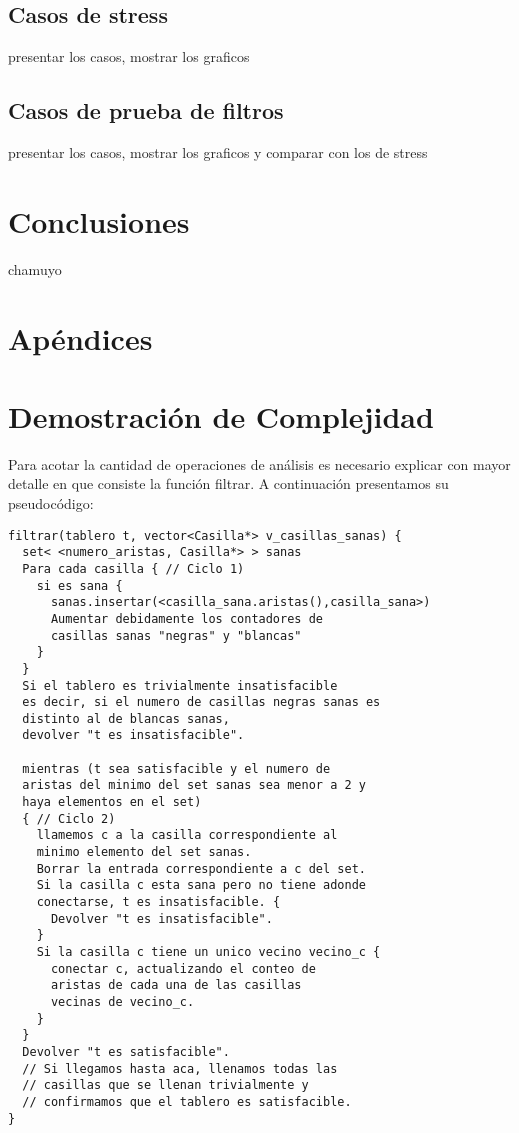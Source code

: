 \documentclass[a4paper, 12pt] {article}
\begin{document}
\subsection*{Casos de stress}
presentar los casos, mostrar los graficos

\subsection*{Casos de prueba de filtros}
presentar los casos, mostrar los graficos y comparar con los de stress




\section*{Conclusiones}
chamuyo


\section*{Ap\'endices} 
\section{Demostraci\'on de Complejidad}\label{demo:comp_3}

Para acotar la cantidad de operaciones de an\'alisis es necesario explicar con mayor detalle en que consiste la funci\'on filtrar.
A continuaci\'on presentamos su pseudoc\'odigo:

\begin{verbatim}
filtrar(tablero t, vector<Casilla*> v_casillas_sanas) {
  set< <numero_aristas, Casilla*> > sanas
  Para cada casilla { // Ciclo 1)
    si es sana {
      sanas.insertar(<casilla_sana.aristas(),casilla_sana>)
      Aumentar debidamente los contadores de 
      casillas sanas "negras" y "blancas"
    }
  }
  Si el tablero es trivialmente insatisfacible 
  es decir, si el numero de casillas negras sanas es 
  distinto al de blancas sanas,
  devolver "t es insatisfacible".
  
  mientras (t sea satisfacible y el numero de 
  aristas del minimo del set sanas sea menor a 2 y
  haya elementos en el set)
  { // Ciclo 2)
    llamemos c a la casilla correspondiente al
    minimo elemento del set sanas.
    Borrar la entrada correspondiente a c del set.
    Si la casilla c esta sana pero no tiene adonde 
    conectarse, t es insatisfacible. {
      Devolver "t es insatisfacible".
    }
    Si la casilla c tiene un unico vecino vecino_c {
      conectar c, actualizando el conteo de
      aristas de cada una de las casillas 
      vecinas de vecino_c.
    }
  }
  Devolver "t es satisfacible".
  // Si llegamos hasta aca, llenamos todas las
  // casillas que se llenan trivialmente y 
  // confirmamos que el tablero es satisfacible.
}

\end{verbatim}
\end{document}

